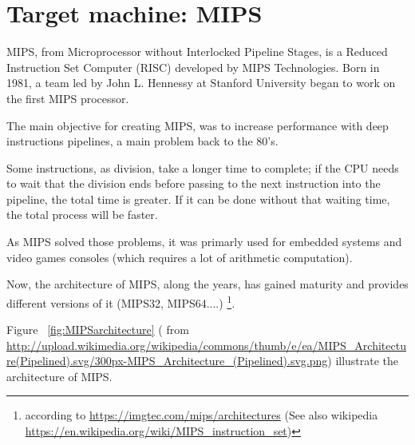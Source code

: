 \documentclass[
  oneside,
  11pt, a4paper,
  footinclude=true,
  headinclude=true,
  cleardoublepage=empty
]{scrbook}
\begin{document}
\chapter{Target machine: MIPS}


MIPS, from Microprocessor without Interlocked Pipeline Stages, is a Reduced Instruction Set Computer (RISC) developed by MIPS Technologies. 
Born in 1981, a team led by John L. Hennessy at Stanford University began to work on the first MIPS processor.

The main objective for creating MIPS, was to increase performance with deep instructions pipelines, a main problem back to the 80's. 

Some instructions, as division, take a longer time to complete; if the CPU needs to wait that the division ends before passing to the next instruction into the pipeline, the total time is greater. If it can be done without that waiting time, the total process will be faster.

As MIPS solved those problems, it was primarly used for embedded systems and video games consoles (which requires a lot of arithmetic computation). 

Now, the architecture of MIPS, along the years, has gained maturity and provides different versions of it (MIPS32, MIPS64....) \footnote{according to \url{https://imgtec.com/mips/architectures} (See also wikipedia \url{https://en.wikipedia.org/wiki/MIPS_instruction_set})}.

Figure ~\ref{fig:MIPSarchitecture} ( from \url{http://upload.wikimedia.org/wikipedia/commons/thumb/e/ea/MIPS\_Architecture(Pipelined).svg/300px-MIPS\_Architecture\_(Pipelined).svg.png}) illustrate the architecture of MIPS.

\end{document}
